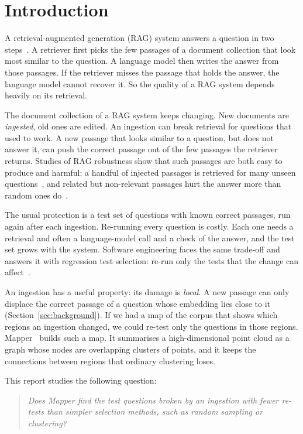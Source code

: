 \section{Introduction}
\label{sec:introduction}

A retrieval-augmented generation (RAG) system answers a question in two
steps~\cite{lewis2020rag}. A retriever first picks the few passages of a
document collection that look most similar to the question. A language
model then writes the answer from those passages. If the retriever misses
the passage that holds the answer, the language model cannot recover it.
So the quality of a RAG system depends heavily on its retrieval.

The document collection of a RAG system keeps changing. New documents are
\emph{ingested}, old ones are edited. An ingestion can break retrieval for
questions that used to work. A new passage that looks similar to a
question, but does not answer it, can push the correct passage out of the
few passages the retriever returns. Studies of RAG robustness show that
such passages are both easy to produce and harmful: a handful of injected
passages is retrieved for many unseen questions~\cite{zhong2023poisoning,
zou2025poisonedrag}, and related but non-relevant passages hurt the
answer more than random ones do~\cite{cuconasu2024noise}.

The usual protection is a test set of questions with known correct
passages, run again after each ingestion. Re-running every question is
costly. Each one needs a retrieval and often a language-model call and a
check of the answer, and the test set grows with the system. Software
engineering faces the same trade-off and answers it with regression test
selection: re-run only the tests that the change can
affect~\cite{rothermel1997safe, yoo2012regression}.

An ingestion has a useful property: its damage is \emph{local}. A new
passage can only displace the correct passage of a question whose
embedding lies close to it (Section~\ref{sec:background}). If we had a map
of the corpus that shows which regions an ingestion changed, we could
re-test only the questions in those regions. Mapper~\cite{singh2007topological}
builds such a map. It summarises a high-dimensional point cloud as a graph
whose nodes are overlapping clusters of points, and it keeps the
connections between regions that ordinary clustering loses.

This report studies the following question:
\begin{quote}
\emph{Does Mapper find the test questions broken by an ingestion with fewer
re-tests than simpler selection methods, such as random sampling or
clustering?}
\end{quote}

